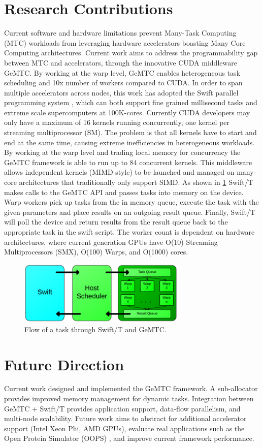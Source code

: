 \documentclass[conference]{IEEEtran}
\begin{document}
\section{Research Contributions}
Current software and hardware limitations prevent Many-Task Computing (MTC) workloads from leveraging hardware accelerators boasting Many Core Computing architectures. Current work aims to address the programmability gap between MTC and accelerators, through the innovative CUDA middleware GeMTC. By working at the warp level, GeMTC enables heterogeneous task scheduling and 10x number of workers compared to CUDA. In order to span multiple accelerators across nodes, this work has adopted the Swift parallel programming system \cite{zhao2007swift}, which can both support fine grained millisecond tasks and extreme scale supercomputers at 100K-cores. Currently CUDA developers may only have a maximum of 16 kernels running concurrently, one kernel per streaming multiprocessor (SM). The problem is that all kernels have to start and end at the same time, causing extreme inefficiencies in heterogeneous workloads. By working at the warp level and trading local memory for concurrency the GeMTC framework is able to run up to 84 concurrent kernels. \cite{kriederSC12} This middleware allows independent kernels (MIMD style) to be launched and managed on many-core architectures that traditionally only support SIMD. \cite{kriederXSEDE12} As shown in \ref{fig:big_pic} Swift/T \cite{wozniak13swift} makes calls to the GeMTC API and passes tasks into memory on the device. Warp workers pick up tasks from the in memory queue, execute the task with the given parameters and place results on an outgoing result queue. Finally, Swift/T will poll the device and return results from the result queue back to the appropriate task in the swift script. The worker count is dependent on hardware architectures, where current generation GPUs have O(10) Streaming Multiprocessors (SMX), O(100) Warps, and O(1000) cores. \cite{GK110}
\begin{figure}[h]
\centering\includegraphics[width=8cm]{imgs/big_picture.png}
\caption{Flow of a task through Swift/T and GeMTC.}
\label{fig:big_pic}
\end{figure}

\section{Future Direction}
Current work designed and implemented the GeMTC framework. A sub-allocator provides improved memory management for dynamic tasks. Integration between GeMTC + Swift/T provides application support, data-flow parallelism, and multi-node scalability. Future work aims to abstract for additional accelerator support (Intel Xeon Phi, AMD GPUs), evaluate real applications such as the Open Protein Simulator (OOPS) \cite{OOPS}, and improve current framework performance.



\end{document}
